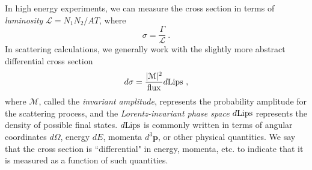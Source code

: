 In high energy experiments, we can measure the cross section in terms of {\it luminosity} $\mathcal{L}=N_1N_2/AT$, where
\begin{equation}
    \sigma = \frac{\Gamma}{\mathcal{L}} \ .
\end{equation}
In scattering calculations, we generally work with the slightly more abstract differential cross section
\begin{equation}
    d\sigma = \frac{|\mathcal{M}|^2}{{\rm flux}} d{\rm Lips} \ ,
\end{equation}
where $\mathcal{M}$, called the {\it invariant amplitude}, represents the probability amplitude for the scattering process, and the {\it Lorentz-invariant phase space} $d{\rm Lips}$ represents the density of possible final states. $d{\rm Lips}$ is commonly written in terms of angular coordinates $d\Omega$, energy $dE$, momenta $d^3\mathbf{p}$, or other physical quantities. We say that the cross section is ``differential" in energy, momenta, etc. to indicate that it is measured as a function of such quantities.




